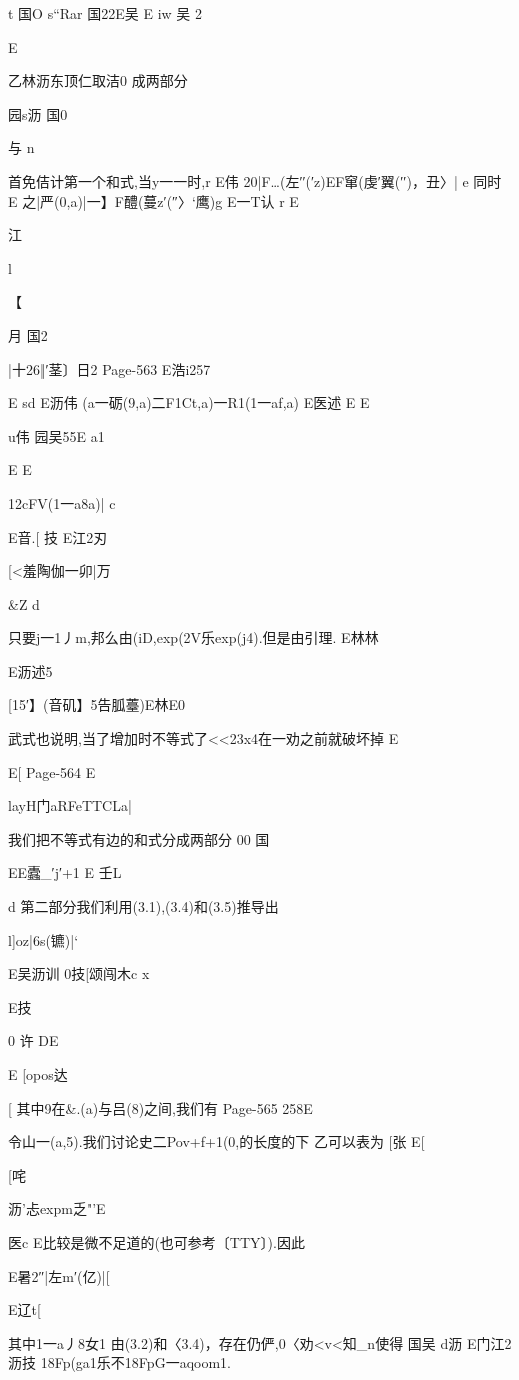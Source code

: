 {{t
国O
s“Rar
国22E吴
E
iw
吴
2

E

乙林沥东顶仁取洁0
成两部分

园s沥
国0

与
n

首免佶计第一个和式,当y一一时,r
E伟
20|F…(左′′(′z)EF窜(虔′翼(′′)，丑〉|
e
同时
E
之|严(0,a)|一】F醴(蔓z′(″〉`鹰)g
E一T认
r
E

江

l

【

月
国2

|十26‖′茎〕日2
Page-563
E浩i257

E
sd
E沥伟
(a一砺(9,a)二F1Ct,a)一R1(1一af,a)
E医述
E
E

u伟
园吴55E
a1

E
E

12cFV(1一a8a)|
c

E音.[
技
E江2刃

[<羞陶伽一卯|万

&Z
d

只要j一1丿m,邦么由(iD,exp(2V乐exp(j4).但是由引理.
E林林

E沥述5

[15′】(音矶】5告胍薹)E林E0

武式也说明,当了增加时不等式了<<23x4在一劝之前就破坏掉
E

E[
Page-564
E

layH门aRFeTTCLa|

我们把不等式有边的和式分成两部分
00
国

EE蠹_′j′+1
E
壬L

d
第二部分我们利用(3.1),(3.4)和(3.5)推导出

l]oz|6s(镳)|`

E吴沥训
0技[颂闯木c
x

E技

0
许
DE

E
[opos达

[
其中9在&.(a)与吕(8)之间,我们有
Page-565
258E

令山一(a,5).我们讨论史二Pov+f+1(0,的长度的下
乙可以表为
[张
E[

[咤

沥'忐expm乏"'E

医c
E比较是微不足道的(也可参考〔TTY〕).因此

E暑2″|左m′(亿)|[

E辽t[

其中1一a丿8女1
由(3.2)和〈3.4)，存在仍俨,0〈劝<v<知_n使得
国吴
d沥
E门江2沥技
18Fp(ga1乐不18FpG一aqoom1.

}}
